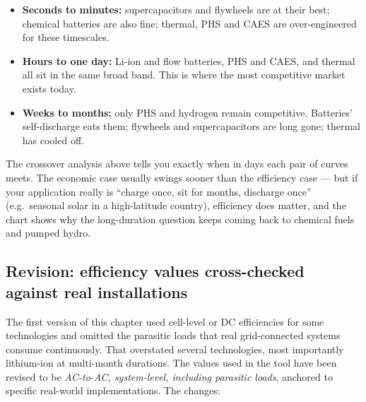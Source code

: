 \begin{itemize}
    \item \textbf{Seconds to minutes:} supercapacitors and flywheels
    are at their best; chemical batteries are also fine; thermal,
    PHS and CAES are over-engineered for these timescales.
    \item \textbf{Hours to one day:} Li-ion and flow batteries, PHS
    and CAES, and thermal all sit in the same broad band. This is
    where the most competitive market exists today.
    \item \textbf{Weeks to months:} only PHS and hydrogen remain
    competitive. Batteries' self-discharge eats them; flywheels and
    supercapacitors are long gone; thermal has cooled off.
\end{itemize}

The crossover analysis above tells you exactly when in days each
pair of curves meets. The economic case usually swings sooner than
the efficiency case --- but if your application really is ``charge
once, sit for months, discharge once'' (e.g.\ seasonal solar in a
high-latitude country), efficiency does matter, and the chart
shows why the long-duration question keeps coming back to chemical
fuels and pumped hydro.

\subsection*{Revision: efficiency values cross-checked against real installations}

The first version of this chapter used cell-level or DC efficiencies
for some technologies and omitted the parasitic loads that real
grid-connected systems consume continuously. That overstated several
technologies, most importantly lithium-ion at multi-month durations.
The values used in the tool have been revised to be \emph{AC-to-AC,
system-level, including parasitic loads}, anchored to specific
real-world implementations. The changes:


